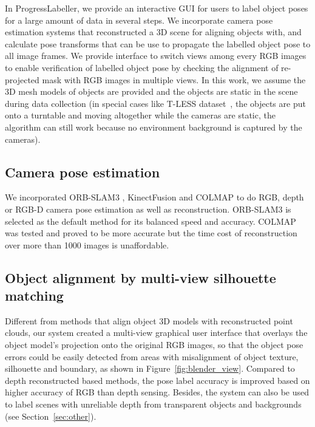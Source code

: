 

In ProgressLabeller, we provide an interactive GUI for users to label object poses for a large amount of data in several steps. We incorporate camera pose estimation systems that reconstructed a 3D scene for aligning objects with, and calculate pose transforms that can be use to propagate the labelled object pose to all image frames. We provide interface to switch views among every RGB images to enable verification of labelled object pose by checking the alignment of re-projected mask with RGB images in multiple views.
In this work, we assume the 3D mesh models of objects are provided and the objects are static in the scene during data collection (in special cases like T-LESS dataset~\cite{hodan2017tless}, the objects are put onto a turntable and moving altogether while the cameras are static, the algorithm can still work because no environment background is captured by the cameras).
\subsection{Camera pose estimation}
We incorporated ORB-SLAM3 \cite{campos2021orb}, KinectFusion \cite{newcombe2011kinectfusion} and COLMAP \cite{schonberger2016structure, schonberger2016pixelwise} to do RGB, depth or RGB-D camera pose estimation as well as reconstruction. ORB-SLAM3 is selected as the default method for its balanced speed and accuracy. COLMAP was tested and proved to be more accurate but the time cost of reconstruction over more than 1000 images is unaffordable.

\subsection{Object alignment by multi-view silhouette matching}
Different from methods that align object 3D models with reconstructed point clouds, our system created a multi-view graphical user interface that overlays the object model's projection onto the original RGB images, so that the object pose errors could be easily detected from areas with misalignment of object texture, silhouette and boundary, as shown in Figure~\ref{fig:blender_view}. Compared to depth reconstructed based methods, the pose label accuracy is improved based on higher accuracy of RGB than depth sensing. Besides, the system can also be used to label scenes with unreliable depth from transparent objects and backgrounds (see Section~\ref{sec:other}).

